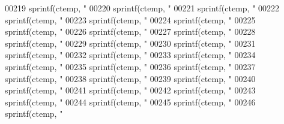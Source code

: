 \begin{DoxyCode}
{{{{{{{{{{{{{{{{{{{{{{{{{{{{{{{{{{{{{{{{{{{{{{{{{{{{{{{{{{{{{{{{{{{{{{{{{{{{{{{00219     sprintf(ctemp, \textcolor{stringliteral}{"%
00220     sprintf(ctemp, \textcolor{stringliteral}{"%
00221     sprintf(ctemp, \textcolor{stringliteral}{"%
00222     sprintf(ctemp, \textcolor{stringliteral}{"%
00223     sprintf(ctemp, \textcolor{stringliteral}{"%
00224     sprintf(ctemp, \textcolor{stringliteral}{"%
00225     sprintf(ctemp, \textcolor{stringliteral}{"%
00226     sprintf(ctemp, \textcolor{stringliteral}{"%
00227     sprintf(ctemp, \textcolor{stringliteral}{"%
00228     sprintf(ctemp, \textcolor{stringliteral}{"%
00229     sprintf(ctemp, \textcolor{stringliteral}{"%
00230     sprintf(ctemp, \textcolor{stringliteral}{"%
00231     sprintf(ctemp, \textcolor{stringliteral}{"%
00232     sprintf(ctemp, \textcolor{stringliteral}{"%
00233     sprintf(ctemp, \textcolor{stringliteral}{"%
00234     sprintf(ctemp, \textcolor{stringliteral}{"%
00235     sprintf(ctemp, \textcolor{stringliteral}{"%
00236     sprintf(ctemp, \textcolor{stringliteral}{"%
00237     sprintf(ctemp, \textcolor{stringliteral}{"%
00238     sprintf(ctemp, \textcolor{stringliteral}{"%
00239     sprintf(ctemp, \textcolor{stringliteral}{"%
00240     sprintf(ctemp, \textcolor{stringliteral}{"%
00241     sprintf(ctemp, \textcolor{stringliteral}{"%
00242     sprintf(ctemp, \textcolor{stringliteral}{"%
00243     sprintf(ctemp, \textcolor{stringliteral}{"%
00244     sprintf(ctemp, \textcolor{stringliteral}{"%
00245     sprintf(ctemp, \textcolor{stringliteral}{"%
00246     sprintf(ctemp, \textcolor{stringliteral}{"%
}}}}}}}}}}}}}}}}}}}}}}}}}}}}}}}}}}}}}}}}}}}}}}}}}}}}}}}}}}}}}}}}}}}}}}}}}}}}}}}}}}}}}}}}}}}}}}}}}}}}}}}}}}}
\end{DoxyCode}
